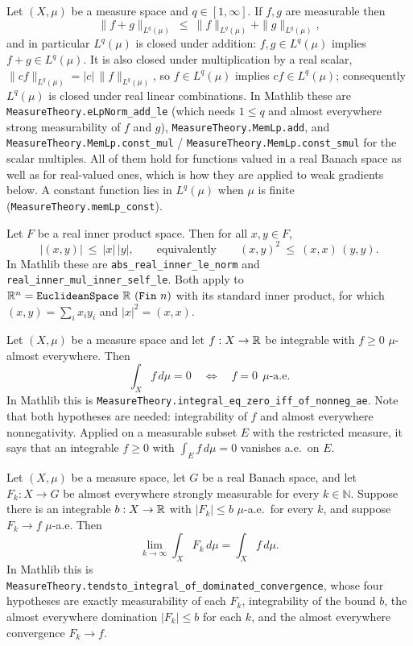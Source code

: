 \begin{proposition}
Let $(X,\mu)$ be a measure space and $q\in[1,\infty]$.  If $f,g$ are measurable
then
\[
\|f+g\|_{L^{q}(\mu)}\ \le\ \|f\|_{L^{q}(\mu)}+\|g\|_{L^{q}(\mu)} ,
\]
and in particular $L^{q}(\mu)$ is closed under addition: $f,g\in L^{q}(\mu)$
implies $f+g\in L^{q}(\mu)$.  It is also closed under multiplication by a real
scalar, $\|cf\|_{L^q(\mu)}=|c|\,\|f\|_{L^q(\mu)}$, so $f\in L^q(\mu)$ implies
$cf\in L^q(\mu)$; consequently $L^q(\mu)$ is closed under real linear
combinations.  In Mathlib these are
\texttt{MeasureTheory.eLpNorm\_add\_le} (which needs $1\le q$ and almost
everywhere strong measurability of $f$ and $g$),
\texttt{MeasureTheory.MemLp.add}, and
\texttt{MeasureTheory.MemLp.const\_mul} / \texttt{MeasureTheory.MemLp.const\_smul}
for the scalar multiples.  All of them hold for functions valued in a real
Banach space as well as for real-valued ones, which is how they are applied to
weak gradients below.  A constant function lies in $L^q(\mu)$ when $\mu$ is
finite (\texttt{MeasureTheory.memLp\_const}).
\end{proposition}

\begin{proposition}
Let $F$ be a real inner product space.  Then for all $x,y\in F$,
\[
|(x,y)|\ \le\ |x|\,|y| ,
\qquad\text{equivalently}\qquad
(x,y)^2\ \le\ (x,x)\,(y,y) .
\]
In Mathlib these are \texttt{abs\_real\_inner\_le\_norm} and
\texttt{real\_inner\_mul\_inner\_self\_le}.  Both apply to
$\R^n=\texttt{EuclideanSpace}\ \R\ (\texttt{Fin}\ n)$ with its standard inner
product, for which $(x,y)=\sum_{i}x_iy_i$ and $|x|^2=(x,x)$.
\end{proposition}

\begin{proposition}
Let $(X,\mu)$ be a measure space and let $f:X\to\mathbb{R}$ be integrable with
$f\ge0$ $\mu$-almost everywhere.  Then
\[
\int_X f\,d\mu=0\quad\Longleftrightarrow\quad f=0\ \ \mu\text{-a.e.}
\]
In Mathlib this is
\texttt{MeasureTheory.integral\_eq\_zero\_iff\_of\_nonneg\_ae}.  Note that both
hypotheses are needed: integrability of $f$ and almost everywhere
nonnegativity.  Applied on a measurable subset $E$ with the restricted measure,
it says that an integrable $f\ge0$ with $\int_Ef\,d\mu=0$ vanishes a.e.\ on
$E$.
\end{proposition}

\begin{proposition}
Let $(X,\mu)$ be a measure space, let $G$ be a real Banach space, and let
$F_k:X\to G$ be almost everywhere strongly measurable for every $k\in\mathbb{N}$.
Suppose there is an integrable $b:X\to\mathbb{R}$ with $|F_k|\le b$ $\mu$-a.e.\ for
every $k$, and suppose $F_k\to f$ $\mu$-a.e.  Then
\[
\lim_{k\to\infty}\int_X F_k\,d\mu=\int_X f\,d\mu .
\]
In Mathlib this is
\texttt{MeasureTheory.tendsto\_integral\_of\_dominated\_convergence}, whose
four hypotheses are exactly measurability of each $F_k$, integrability of the
bound $b$, the almost everywhere domination $|F_k|\le b$ for each $k$, and the
almost everywhere convergence $F_k\to f$.
\end{proposition}

